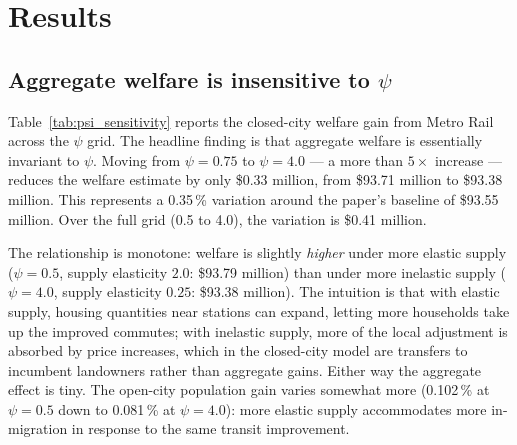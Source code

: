 \documentclass[12pt,a4paper]{article}
\begin{document}
\section{Results}
\label{sec:results}

\subsection{Aggregate welfare is insensitive to $\psi$}
\label{subsec:res_sensitivity}

Table~\ref{tab:psi_sensitivity} reports the closed-city welfare gain from Metro
Rail across the $\psi$ grid.  The headline finding is that aggregate welfare is
essentially invariant to $\psi$.  Moving from $\psi = 0.75$ to $\psi = 4.0$ ---
a more than $5\times$ increase --- reduces the welfare estimate by only \$0.33
million, from \$93.71 million to \$93.38 million.  This represents a 0.35\,\%
variation around the paper's baseline of \$93.55 million.  Over the full grid
(0.5 to 4.0), the variation is \$0.41 million.

The relationship is monotone: welfare is slightly \emph{higher} under more
elastic supply ($\psi = 0.5$, supply elasticity $2.0$: \$93.79 million) than
under more inelastic supply ($\psi = 4.0$, supply elasticity $0.25$: \$93.38
million).  The intuition is that with elastic supply, housing quantities near
stations can expand, letting more households take up the improved commutes;
with inelastic supply, more of the local adjustment is absorbed by price
increases, which in the closed-city model are transfers to incumbent landowners
rather than aggregate gains.  Either way the aggregate effect is tiny.  The
open-city population gain varies somewhat more (0.102\,\% at $\psi = 0.5$ down
to 0.081\,\% at $\psi = 4.0$): more elastic supply accommodates more
in-migration in response to the same transit improvement.
\end{document}
